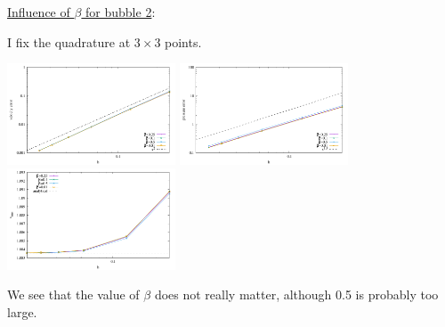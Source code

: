 \underline{Influence of $\beta$ for bubble 2}:

I fix the quadrature at $3\times 3$ points. 

\begin{center}
\includegraphics[width=5cm]{python_codes/fieldstone_74/results/errors_v}
\includegraphics[width=5cm]{python_codes/fieldstone_74/results/errors_p}
\includegraphics[width=5cm]{python_codes/fieldstone_74/results/vrms.pdf}
\end{center}

We see that the value of $\beta$ does not really matter, although 0.5 is probably too large.

